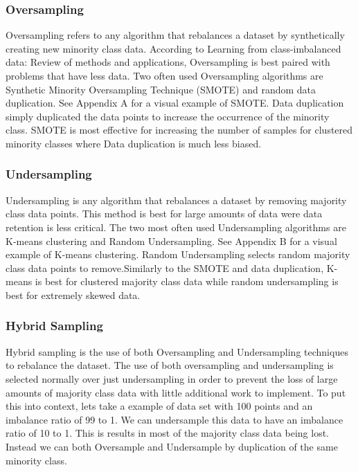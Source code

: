 \subsubsection{Oversampling}
Oversampling refers to any algorithm that rebalances a dataset by synthetically creating new minority class data. According to Learning from class-imbalanced data: Review of methods and applications, Oversampling
is best paired with problems that have less data. Two often used Oversampling algorithms are Synthetic Minority Oversampling Technique (SMOTE) and random data duplication. See Appendix A for a visual example of SMOTE.
Data duplication simply duplicated the data points to increase the occurrence of the minority class. SMOTE is most effective for increasing the number of samples for clustered minority classes where Data duplication is much less biased.

\subsubsection{Undersampling}
Undersampling is any algorithm that rebalances a dataset by removing majority class data points. This method is best for large amounts of data were data retention is less critical. The two most often used Undersampling algorithms are K-means clustering and Random Undersampling. See Appendix B for a visual example of K-means
clustering. Random Undersampling selects random majority class data points to remove.Similarly to the SMOTE and data duplication, K-means is best for clustered majority class data while random undersampling is best for extremely skewed data.

\subsubsection{Hybrid Sampling}
Hybrid sampling is the use of both Oversampling and Undersampling techniques to rebalance the dataset. The use of both oversampling and undersampling is selected normally over just undersampling in order to prevent the loss of large amounts of majority class data with little additional work to implement. To put this into context, lets take a example of data set with 100 points and an imbalance ratio of 99 to 1. We can undersample this data to have an imbalance ratio of 10 to 1. This is results in most of the majority class data being lost. Instead we can both Oversample and Undersample by duplication of the same minority class.

